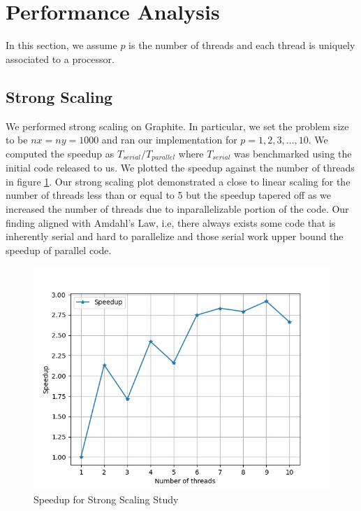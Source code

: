 \documentclass{article}
\begin{document}



\section{Performance Analysis}
In this section, we assume $p$ is the number of threads and each thread is uniquely associated to a processor.

\subsection{Strong Scaling}
\label{sec: strong_scaling}
We performed strong scaling on Graphite. In particular, we set the problem size to be $nx = ny = 1000$ and ran our implementation for $p = 1, 2, 3, \ldots, 10$.
We computed the speedup as $T_{serial} / T_{parallel}$ where $T_{serial}$ was benchmarked using the initial code released to us.
We plotted the speedup against the number of threads in figure \ref{fig:strong_scaling}.
Our strong scaling plot demonstrated a close to linear scaling for the number of threads less than or equal to 5 but the speedup tapered off
as we increased the number of threads due to inparallelizable portion of the code.
Our finding aligned with Amdahl’s Law, i.e, there always exists some code that is inherently serial and hard to parallelize and those serial work upper bound the speedup of parallel code.

\begin{figure}[h!]
	\centering
	\includegraphics[width=0.8\columnwidth]{../strong_scaling.jpg}
	\caption{Speedup for Strong Scaling Study}
	\label{fig:strong_scaling}
\end{figure}
\end{document}
